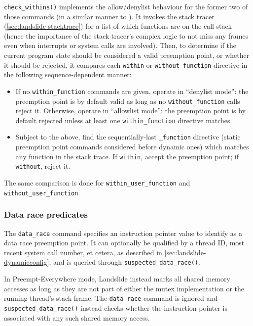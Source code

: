 {\tt check\_withins()} implements the allow/denylist behaviour for the former two of those commands
(in a similar manner to  \cite{sealing}).
It invokes the stack tracer (\cref{sec:landslide-stacktrace})
for a list of which functions are on the call stack
(hence the importance of the stack tracer's complex logic to not miss any frames
even when interrupts or system calls are involved).
Then, to determine if the current program state should be considered a valid preemption point,
or whether it should be rejected,
it compares each {\tt within} or {\tt without\_function} directive in the following sequence-dependent manner:

\begin{itemize}
	\item If no {\tt within\_function} commands are given, operate in ``denylist mode'':
		the preemption point is by default valid as long as no {\tt without\_function} calls reject it.
		Otherwise, operate in ``allowlist mode'':
		the preemption point is by default rejected unless at least one {\tt within\_function} directive matches.
	\item Subject to the above, find the sequentially-last {\tt *\_function} directive
		(static preemption point commands considered before dynamic ones)
		which matches any function in the stack trace.
		If {\tt within}, accept the preemption point; if {\tt without}, reject it.
\end{itemize}

The same comparison is done for {\tt within\_user\_function} and {\tt without\_user\_function}.

\subsubsection{Data race predicates}

The {\tt data\_race} command specifies an instruction pointer value to identify as a data race preemption point.
It can optionally be qualified by a thread ID, most recent system call number, et cetera,
as described in \cref{sec:landslide-dynamicconfig},
and is queried through {\tt suspected\_data\_race()}.

In Preempt-Everywhere mode, Landslide instead marks all shared memory accesses
as long as they are not part of either the mutex implementation or the running thread's stack frame.
The {\tt data\_race} command is ignored and {\tt suspected\_data\_race()}
instead checks whether the instruction pointer is associated with any such shared memory access.

